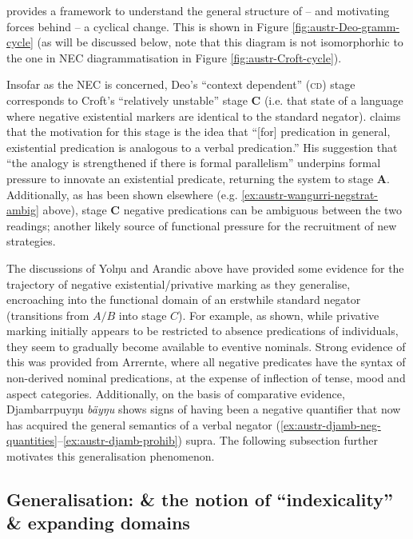 \documentclass[output=paper]{langsci/langscibook}
\begin{document}
\citet{Deo2015a} provides a framework to understand the general structure of -- and motivating forces behind -- a cyclical change. This is shown in Figure \ref{fig:austr-Deo-gramm-cycle} (as will be discussed below, note that this diagram is not isomorphorhic to the one in NEC diagrammatisation in Figure \ref{fig:austr-Croft-cycle}).

Insofar as the NEC is concerned, Deo's ``context dependent'' (\textsc{cd}) stage corresponds to Croft's ``relatively unstable'' stage \textbf{C} (i.e. that state of a language where negative existential markers are identical to the standard negator). \citet[19]{Croft1991} claims that the motivation for this stage is the idea that ``[for] predication in general, existential predication is analogous to a verbal predication.'' His suggestion that ``the analogy is strengthened if there is formal parallelism'' underpins formal pressure to innovate an existential predicate, returning the system to stage \textbf{A}. Additionally, as has been shown elsewhere (e.g. \ref{ex:austr-wangurri-negstrat-ambig} above), stage \textbf{C} negative predications can be ambiguous between the two readings; another likely source of functional pressure for the recruitment of new strategies.

The discussions of Yolŋu and Arandic above have provided some evidence for
    the trajectory of negative existential\slash privative marking as they
    generalise, encroaching into the functional domain of an erstwhile
    standard negator (transitions from $A/B$ into stage $C$). For example,
    as shown, while privative marking initially appears to be restricted to
    absence predications of individuals, they seem to gradually become
    available to eventive nominals. Strong evidence of this was provided
    from Arrernte, where all negative predicates have the syntax of
    non-derived nominal predications, at the expense of inflection of
    tense, mood and aspect categories. Additionally, on the basis of
    comparative evidence, Djambarrpuyŋu \textit{bäyŋu} shows signs of
    having been a negative quantifier that now has acquired the general
    semantics of a verbal negator (\ref{ex:austr-djamb-neg-quantities}--\ref{ex:austr-djamb-prohib}) supra. The following subsection further motivates this generalisation phenomenon. 

\subsection{Generalisation: \& the notion of ``indexicality'' \& expanding domains}
\end{document}
